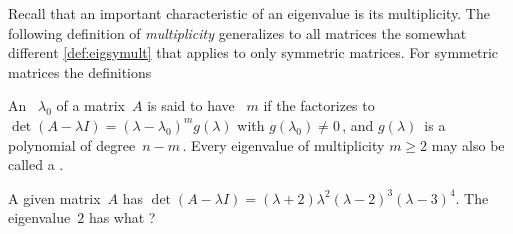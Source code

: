 Recall that an important characteristic of an eigenvalue is its multiplicity.
The following definition of \emph{multiplicity} generalizes to all matrices the somewhat different \cref{def:eigsymult} that applies to only symmetric matrices.
For symmetric matrices the definitions 


\begin{definition} \label{def:eigmult}
An ~\(\lambda_0\) of a matrix~\(A\) is said to have ~\(m\) if the  factorizes to \(\det(A-\lambda I)=(\lambda-\lambda_0)^mg(\lambda)\) with \(g(\lambda_0)\neq0\)\,, and \(g(\lambda)\)~is a polynomial of degree~\(n-m\)\,.
Every eigenvalue of multiplicity \(m\geq2\) may also be called a .
\end{definition}



\begin{activity}
A given matrix~\(A\) has  \(\det(A-\lambda I)=(\lambda+2)\lambda^2(\lambda-2)^3(\lambda-3)^4\).
The eigenvalue~\(2\) has what ?
\end{activity}



